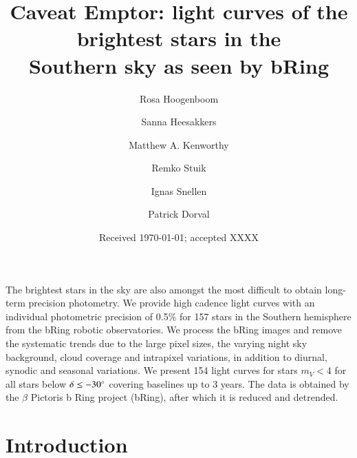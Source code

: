 \documentclass{aa}
\begin{document}
 

   \title{Caveat Emptor: light curves of the brightest stars in the \\ Southern sky as seen by bRing}

   \author{Rosa Hoogenboom
          \and
          Sanna Heesakkers
          \and
          Matthew A. Kenworthy
          \and
          Remko Stuik
          \and
          Ignas Snellen
          \and
          Patrick Dorval
          }


   \date{Received \today; accepted XXXX}

 
  \abstract
   {The brightest stars in the sky are also amongst the most difficult to obtain long-term precision photometry. }
   {We provide high cadence light curves with an individual photometric precision of 0.5\% for 157 stars in the Southern hemisphere from the bRing robotic observatories.}
   {We process the bRing images and remove the systematic trends due to the large pixel sizes, the varying night sky background, cloud coverage and intrapixel variations, in addition to diurnal, synodic and seasonal variations.}
   {We present 154 light curves for stars $m_V<4$ for all stars below $\delta \leq -30^\circ $ covering baselines up to 3 years. The data is obtained by the $\beta$ Pictoris b Ring project (bRing), after which it is reduced and detrended.}
   {}


   \maketitle
%

\section{Introduction}
\end{document}
